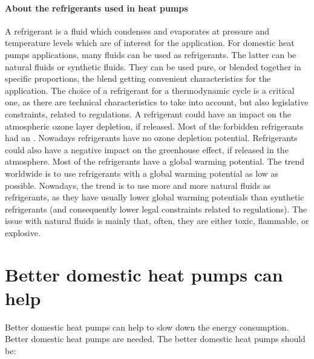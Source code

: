 \paragraph{About the refrigerants used  in heat pumps}

A refrigerant is a fluid which condenses and
evaporates at pressure and temperature levels which are of interest
for the application. For domestic heat pumps applications, many fluids
can be used as refrigerants. The latter can be natural fluids or
synthetic fluids. They can be used pure, or blended together in
specific proportions, the blend getting convenient characteristics for
the application. The choice of a refrigerant for a thermodynamic cycle
is a critical one, as there are technical characteristics to take into
account, but also legislative constraints, related to regulations. A
refrigerant could have an impact on the atmospheric ozone layer
depletion, if released. Most of the forbidden refrigerants had an
\ODP{}. Nowadays refrigerants have no ozone
depletion potential. Refrigerants could also have a negative impact on
the greenhouse effect, if released in the atmosphere. Most of the
refrigerants have a global warming potential. The trend worldwide is
to use refrigerants with a global warming potential as low as
possible. Nowadays, the trend is to use more and more natural fluids
as refrigerants, as they have usually lower global warming potentials
than synthetic refrigerants (and consequently lower legal constraints
related to regulations). The issue with natural fluids is mainly
that, often, they are either toxic, flammable, or explosive.

\section{Better domestic heat pumps can help}
\label{sec:better-hp}

Better domestic heat pumps can help to slow down the energy
consumption. Better domestic heat pumps are needed. The better
domestic heat pumps should be:


